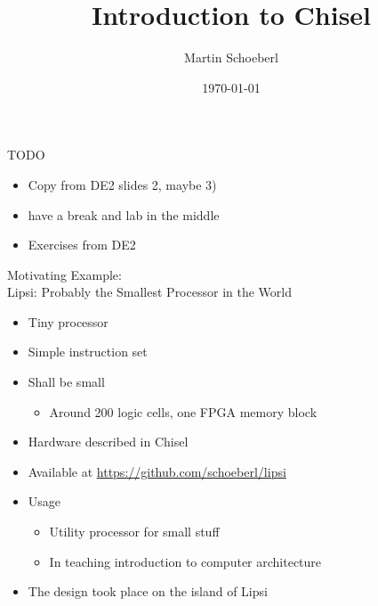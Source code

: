 

\newif\ifbook


\usepackage{tikz}
\usetikzlibrary{positioning, arrows.meta}


\title{Introduction to Chisel}
\author{Martin Schoeberl}
\date{\today}



\begin{frame}
\titlepage
\end{frame}

\begin{frame}[fragile]{TODO}
\begin{itemize}
\item Copy from DE2 slides 2, maybe 3)
\item have a break and lab in the middle
\item Exercises from DE2
\end{itemize}
\end{frame}

\begin{frame}[fragile]{Motivating Example:\\
Lipsi: Probably the Smallest Processor in the World}
\begin{itemize}
\item Tiny processor
\item Simple instruction set
\item Shall be small
\begin{itemize}
\item Around 200 logic cells, one FPGA memory block
\end{itemize}
\item Hardware described in Chisel
\item Available at \url{https://github.com/schoeberl/lipsi}
\item Usage
\begin{itemize}
\item Utility processor for small stuff
\item In teaching introduction to computer architecture
\end{itemize}
\item The design took place on the island of Lipsi
\end{itemize}
\end{frame}

